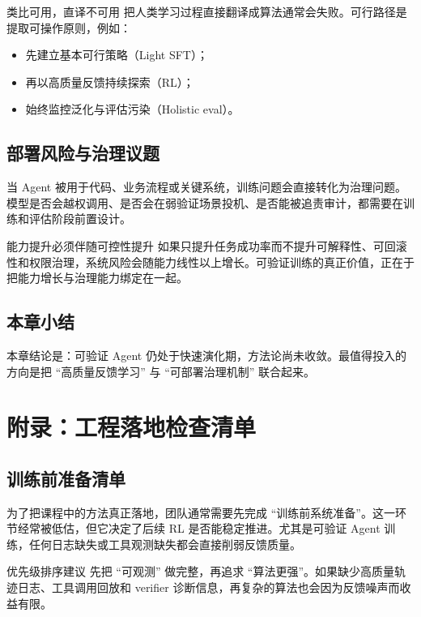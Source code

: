 \documentclass[a4paper]{article}
\begin{document}
\begin{knowledgebox}{类比可用，直译不可用}
把人类学习过程直接翻译成算法通常会失败。可行路径是提取可操作原则，例如：
\begin{itemize}
    \item 先建立基本可行策略（Light SFT）；
    \item 再以高质量反馈持续探索（RL）；
    \item 始终监控泛化与评估污染（Holistic eval）。
\end{itemize}
\end{knowledgebox}

\subsection{部署风险与治理议题}
当 Agent 被用于代码、业务流程或关键系统，训练问题会直接转化为治理问题。模型是否会越权调用、是否会在弱验证场景投机、是否能被追责审计，都需要在训练和评估阶段前置设计。

\begin{warningbox}{能力提升必须伴随可控性提升}
如果只提升任务成功率而不提升可解释性、可回滚性和权限治理，系统风险会随能力线性以上增长。可验证训练的真正价值，正在于把能力增长与治理能力绑定在一起。
\end{warningbox}

\subsection{本章小结}
本章结论是：可验证 Agent 仍处于快速演化期，方法论尚未收敛。最值得投入的方向是把 ``高质量反馈学习'' 与 ``可部署治理机制'' 联合起来。

\section{附录：工程落地检查清单}

\subsection{训练前准备清单}
为了把课程中的方法真正落地，团队通常需要先完成 ``训练前系统准备''。这一环节经常被低估，但它决定了后续 RL 是否能稳定推进。尤其是可验证 Agent 训练，任何日志缺失或工具观测缺失都会直接削弱反馈质量。

\begin{importantbox}{优先级排序建议}
先把 ``可观测'' 做完整，再追求 ``算法更强''。如果缺少高质量轨迹日志、工具调用回放和 verifier 诊断信息，再复杂的算法也会因为反馈噪声而收益有限。
\end{importantbox}
\end{document}
